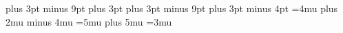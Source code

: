 \abovedisplayskip=12pt plus 3pt minus 9pt %
\abovedisplayshortskip=0pt plus 3pt %
\belowdisplayskip=12pt plus 3pt minus 9pt %
\belowdisplayshortskip=7pt plus 3pt minus 4pt %
\delimitershortfall=5pt %
\medmuskip=4mu plus 2mu minus 4mu %
\nulldelimiterspace=1.2pt %
\scriptspace=0.5pt %
\thickmuskip=5mu plus 5mu %
\thinmuskip=3mu %
